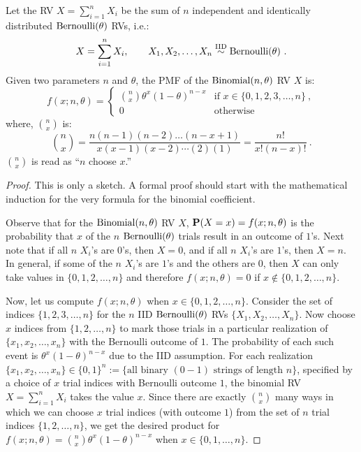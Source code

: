 \begin{model}\label{M:binomial}
Let the RV $X=\sum_{i=1}^n X_i$ be the sum of $n$ independent and identically distributed $\mbox{{\rm Bernoulli}}(\theta)$ RVs, i.e.:
\[
X=\sum_{i=1}^n X_i, \qquad X_1,X_2,\ldots,X_n \overset{{\rm IID}}{\sim} \mbox{{\rm Bernoulli}}(\theta) \ .
\]
Given two parameters $n$ and $\theta$, the PMF of the $\mbox{{\rm Binomial}}(n,\theta)$ RV $X$ is:
\begin{equation}
 f(x; n,\theta) =
 \begin{cases}
 \displaystyle\binom{n}{x} \theta^x (1-\theta)^{n-x} & \text{if $x \in \{0,1,2,3,\ldots,n\}$} \ ,\\
 0 & \text{otherwise}
 \end{cases}
 \end{equation}
where, $\binom{n}{x}$ is:
\[
\binom{n}{x} = \frac{n(n-1)(n-2)\ldots(n-x+1)}{x(x-1)(x-2)\cdots (2)(1)} =  \frac{n !}{x! (n-x)!} \ .
 \]
$\binom{n}{x}$ is read as ``$n$ choose $x$.''
 \end{model}
\begin{proof} This is only a sketch. A formal proof should start with the mathematical induction for the very formula for the binomial coefficient.

Observe that for the $\mbox{{\rm Binomial}}(n,\theta)$ RV $X$, $\mathbf{P}(X=x) = f(x;n,\theta)$ is the probability that $x$ of the $n$ $\mbox{{\rm Bernoulli}}(\theta)$ trials result in an outcome of $1$'s.  Next note that if all $n$ $X_i$'s are $0$'s, then $X=0$, and if all $n$ $X_i$'s are $1$'s, then $X=n$.  In general, if some of the $n$ $X_i$'s are $1$'s and the others are $0$, then $X$ can only take values in $\{0,1,2,\ldots,n\}$ and therefore $f(x;n,\theta)=0$ if $x \notin \{0,1,2,\ldots,n\}$.

Now, let us compute $f(x;n,\theta)$ when $x\in\{0,1,2,\ldots,n\}$.  Consider the set of indices $\{1,2,3,\ldots,n\}$ for the $n$ IID $\mbox{{\rm Bernoulli}}(\theta)$ RVs $\{X_1,X_2,\ldots,X_n\}$.  Now choose $x$ indices from $\{1,2,\ldots,n\}$ to mark those trials in a particular realization of $\{x_1,x_2,\ldots,x_n\}$ with the Bernoulli outcome of $1$.  The probability of each such event is $\theta^x (1-\theta)^{n-x}$ due to the IID assumption.  For each realization $\{x_1,x_2,\ldots,x_n\} \in \{0,1\}^{n} := \{ \text{all binary $(0-1)$ strings of length $n$}\}$, specified by a choice of $x$ trial indices with Bernoulli outcome $1$, the binomial RV $X=\sum_{i=1}^n X_i$ takes the value $x$.  Since there are exactly $\binom{n}{x}$ many ways in which we can choose $x$ trial indices (with outcome $1$) from the set of $n$ trial indices $\{1,2,\ldots,n\}$, we get the desired product for $f(x; n,\theta) = \binom{n}{x} \theta^x (1-\theta)^{n-x}$ when $x \in \{0,1,\ldots,n\}$.
\end{proof}
